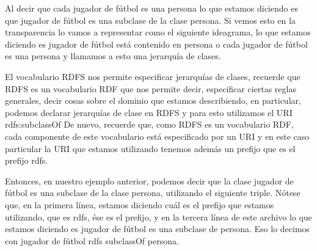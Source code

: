 Al decir que cada jugador de fútbol es una persona lo que estamos diciendo es que jugador de fútbol es una subclase de la clase persona. Si vemos esto en la transparencia lo vamos a representar como el siguiente ideagrama, lo que estamos diciendo es jugador de fútbol está contenido en persona o cada jugador de fútbol es una persona y llamamos a esto una jerarquía de clases.

El vocabulario RDFS nos permite especificar jerarquías de clases, recuerde que RDFS es un vocabulario RDF que nos permite decir, especificar ciertas reglas generales, decir cosas sobre el dominio que estamos describiendo, en particular, podemos declarar jerarquías de clase en RDFS y para esto utilizamos el URI rdfs:subclassOf De nuevo, recuerde que, como RDFS es un vocabulario RDF, cada componente de este vocabulario está especificado por un URI y en este caso particular la URI que estamos utilizando tenemos además un prefijo que es el prefijo rdfs.

Entonces, en nuestro ejemplo anterior, podemos decir que la clase jugador de fútbol es una subclase de la clase persona, utilizando el siguiente triple. Nótese que, en la primera línea, estamos diciendo cuál es el prefijo que estamos utilizando, que es rdfs, ése es el prefijo, y en la tercera línea de este archivo lo que estamos diciendo es jugador de fútbol es una subclase de persona. Eso lo decimos con jugador de fútbol rdfs subclassOf persona.

